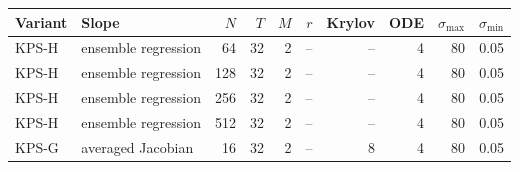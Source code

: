 \begin{tabular}{llrrrrrrrr}
\toprule
Variant & Slope & $N$ & $T$ & $M$ & $r$ & Krylov & ODE & $\sigma_{\max}$ & $\sigma_{\min}$ \\
\midrule
KPS-H & ensemble regression & 64 & 32 & 2 & -- & -- & 4 & 80 & 0.05 \\
KPS-H & ensemble regression & 128 & 32 & 2 & -- & -- & 4 & 80 & 0.05 \\
KPS-H & ensemble regression & 256 & 32 & 2 & -- & -- & 4 & 80 & 0.05 \\
KPS-H & ensemble regression & 512 & 32 & 2 & -- & -- & 4 & 80 & 0.05 \\
KPS-G & averaged Jacobian & 16 & 32 & 2 & -- & 8 & 4 & 80 & 0.05 \\
\bottomrule
\end{tabular}
